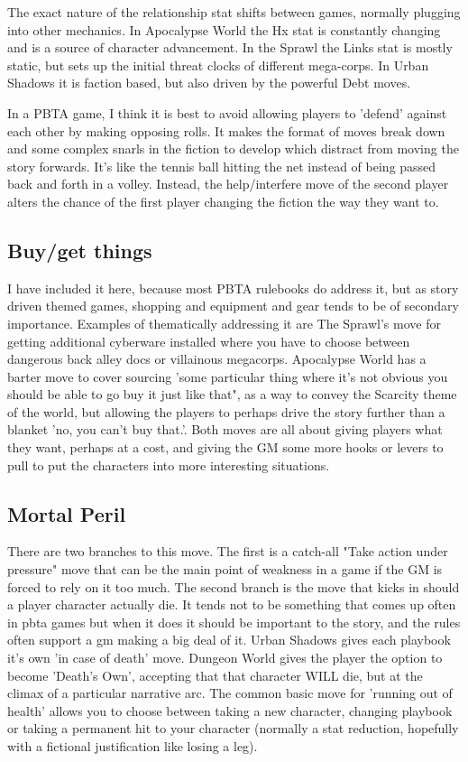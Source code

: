 \documentclass{tufte-handout}
\begin{document}
The exact nature of the relationship stat shifts between games, normally plugging into other mechanics. In Apocalypse World the Hx stat is constantly changing and is a source of character advancement. In the Sprawl the Links stat is mostly static, but sets up the initial threat clocks of different mega-corps. In Urban Shadows it is faction based, but also driven by the powerful Debt moves.

In a PBTA game, I think it is best to avoid allowing players to 'defend' against each other by making opposing rolls. It makes the format of moves break down and some complex snarls in the fiction to develop which distract from moving the story forwards. It's like the tennis ball hitting the net instead of being passed back and forth in a volley. Instead, the help/interfere move of the second player alters the chance of the first player changing the fiction the way they want to.

\subsection{Buy/get things}
I have included it here, because most PBTA rulebooks do address it, but as story driven themed games, shopping and equipment and gear tends to be of secondary importance. Examples of thematically addressing it are The Sprawl's move for getting additional cyberware installed where you have to choose between dangerous back alley docs or villainous megacorps. 
Apocalypse World has a barter move to cover sourcing 'some particular thing where it's not obvious you should be able to go buy it just like that", as a way to convey the Scarcity theme of the world, but allowing the players to perhaps drive the story further than a blanket 'no, you can't buy that.'. 
Both moves are all about giving players what they want, perhaps at a cost, and giving the GM some more hooks or levers to pull to put the characters into more interesting situations.

\subsection{Mortal Peril}
There are two branches to this move. The first is a catch-all "Take action under pressure" move that can be the main point of weakness in a game if the GM is forced to rely on it too much. 
The second branch is the move that kicks in should a player character actually die. It tends not to be something that comes up often in pbta games but when it does it should be important to the story, and the rules often support a gm making a big deal of it. Urban Shadows gives each playbook it's own 'in case of death' move. Dungeon World gives the player the option to become 'Death's Own', accepting that that character WILL die, but at the climax of a particular narrative arc.
The common basic move for 'running out of health' allows you to choose between taking a new character, changing playbook or taking a permanent hit to your character (normally a stat reduction, hopefully with a fictional justification like losing a leg). 
\end{document}
